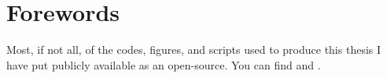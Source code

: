 \chapter*{Forewords}

Most, if not all, of the codes, figures, and scripts used to produce this thesis I have put publicly available as an open-source.
You can find  and .

